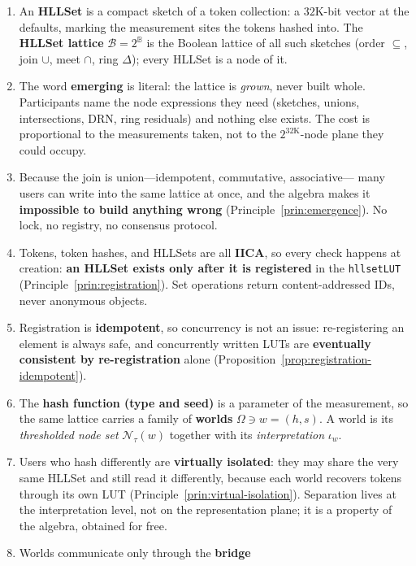 \documentclass[11pt,a4paper]{article}
\theoremstyle{remark}
\newcommand{\Lat}{\ensuremath{\mathcal{B}}}         %
\newcommand{\Plane}{\ensuremath{\mathbb{B}}}        %
\newcommand{\iotaw}{\ensuremath{\iota_{w}}}         %
\begin{document}
\begin{enumerate}[leftmargin=*,nosep]
  \item An \textbf{HLLSet} is a compact sketch of a token collection: a
    $32$K-bit vector at the defaults, marking the measurement sites the tokens
    hashed into. The \textbf{HLLSet lattice} $\Lat = 2^{\Plane}$ is the Boolean
    lattice of all such sketches (order $\subseteq$, join $\cup$, meet $\cap$,
    ring $\Delta$); every HLLSet is a node of it.
  \item The word \textbf{emerging} is literal: the lattice is \emph{grown}, never
    built whole. Participants name the node expressions they need (sketches,
    unions, intersections, DRN, ring residuals) and nothing else exists. The
    cost is proportional to the measurements taken, not to the
    $2^{32\mathrm{K}}$-node plane they could occupy.
  \item Because the join is union---idempotent, commutative, associative---%
    many users can write into the same lattice at once, and the algebra makes
    it \textbf{impossible to build anything wrong} (Principle~\ref{prin:emergence}).
    No lock, no registry, no consensus protocol.
  \item Tokens, token hashes, and HLLSets are all \textbf{IICA}, so every check
    happens at creation: \textbf{an HLLSet exists only after it is registered}
    in the \texttt{hllsetLUT} (Principle~\ref{prin:registration}). Set
    operations return content-addressed IDs, never anonymous objects.
  \item Registration is \textbf{idempotent}, so concurrency is not an issue:
    re-registering an element is always safe, and concurrently written LUTs are
    \textbf{eventually consistent by re-registration} alone
    (Proposition~\ref{prop:registration-idempotent}).
  \item The \textbf{hash function (type and seed)} is a parameter of the
    measurement, so the same lattice carries a family of \textbf{worlds}
    $\Omega\ni w=(h,s)$. A world is its \emph{thresholded node set}
    $\mathcal{N}_\tau(w)$ together with its \emph{interpretation} $\iotaw$.
  \item Users who hash differently are \textbf{virtually isolated}: they may
    share the very same HLLSet and still read it differently, because each world
    recovers tokens through its own LUT (Principle~\ref{prin:virtual-isolation}).
    Separation lives at the interpretation level, not on the representation
    plane; it is a property of the algebra, obtained for free.
  \item Worlds communicate only through the \textbf{bridge}

\end{enumerate}
\end{document}
